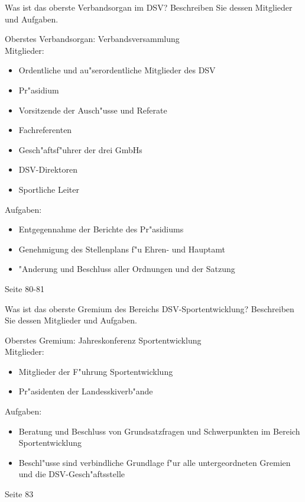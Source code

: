 \begin{question}{5}
Was ist das oberste Verbandsorgan im DSV? Beschreiben Sie dessen Mitglieder und Aufgaben.
\end{question}
\begin{solution}
Oberstes Verbandsorgan: Verbandsversammlung\\
Mitglieder:
\begin{itemize}
\item Ordentliche und au"serordentliche Mitglieder des DSV
\item Pr"asidium
\item Vorsitzende der Ausch"usse und Referate
\item Fachreferenten
\item Gesch"aftsf"uhrer der drei GmbHs
\item DSV-Direktoren
\item Sportliche Leiter
\end{itemize}
Aufgaben:
\begin{itemize}
\item Entgegennahme der Berichte des Pr"asidiums
\item Genehmigung des Stellenplans f"u Ehren- und Hauptamt
\item "Anderung und Beschluss aller Ordnungen und der Satzung
\end{itemize}
 Seite 80-81
\end{solution}

\begin{question}{5}
Was ist das oberste Gremium des Bereichs DSV-Sportentwicklung? Beschreiben Sie dessen Mitglieder und Aufgaben.
\end{question}
\begin{solution}
Oberstes Gremium: Jahreskonferenz Sportentwicklung\\
Mitglieder:
\begin{itemize}
\item Mitglieder der F"uhrung Sportentwicklung
\item Pr"asidenten der Landesskiverb"ande
\end{itemize}
Aufgaben:
\begin{itemize}
\item Beratung und Beschluss von Grundsatzfragen und Schwerpunkten im Bereich Sportentwicklung
\item Beschl"usse sind verbindliche Grundlage f"ur alle untergeordneten Gremien und die DSV-Gesch"aftsstelle
\end{itemize}
 Seite 83
\end{solution}

